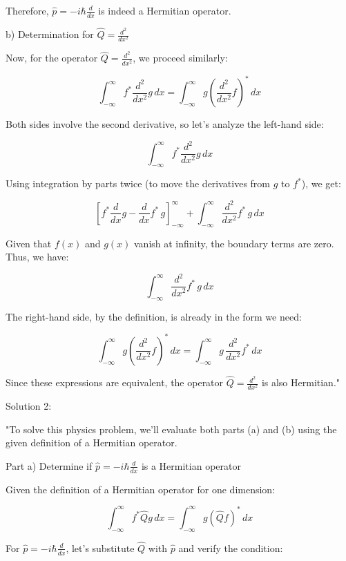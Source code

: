Therefore, \( \hat{p} = -i\hbar\frac{d}{dx} \) is indeed a Hermitian operator.

b) Determination for \( \hat{Q} = \frac{d^{2}}{dx^{2}} \)

Now, for the operator \( \hat{Q} = \frac{d^{2}}{dx^{2}} \), we proceed similarly:

\[ \int_{-\infty}^{\infty} f^{*}\frac{d^{2}}{dx^{2}}g \, dx = \int_{-\infty}^{\infty} g\left(\frac{d^{2}}{dx^{2}}f\right)^{*} \, dx \]

Both sides involve the second derivative, so let's analyze the left-hand side:

\[ \int_{-\infty}^{\infty} f^{*}\frac{d^{2}}{dx^{2}}g \, dx \]

Using integration by parts twice (to move the derivatives from \(g\) to \(f^{*}\)), we get:

\[ \left[ f^{*}\frac{d}{dx}g - \frac{d}{dx}f^{*} \, g \right]_{-\infty}^{\infty} + \int_{-\infty}^{\infty} \frac{d^{2}}{dx^{2}}f^{*} \, g \, dx \]

Given that \(f(x)\) and \(g(x)\) vanish at infinity, the boundary terms are zero. Thus, we have:

\[ \int_{-\infty}^{\infty} \frac{d^{2}}{dx^{2}}f^{*} \, g \, dx \]

The right-hand side, by the definition, is already in the form we need:

\[ \int_{-\infty}^{\infty} g\left(\frac{d^{2}}{dx^{2}}f\right)^{*} \, dx = \int_{-\infty}^{\infty} g \, \frac{d^{2}}{dx^{2}}f^{*} \, dx \]

Since these expressions are equivalent, the operator \( \hat{Q} = \frac{d^{2}}{dx^{2}} \) is also Hermitian."

Solution 2:

"To solve this physics problem, we'll evaluate both parts (a) and (b) using the given definition of a Hermitian operator.

Part a) Determine if \( \hat{p} = -i\hbar\frac{d}{dx} \) is a Hermitian operator

Given the definition of a Hermitian operator for one dimension:

\[ \int_{-\infty}^{\infty} f^{*}\hat{Q}g \, dx = \int_{-\infty}^{\infty} g(\hat{Q}f)^{*} \, dx \]

For \( \hat{p} = -i\hbar\frac{d}{dx} \), let's substitute \( \hat{Q} \) with \( \hat{p} \) and verify the condition:


